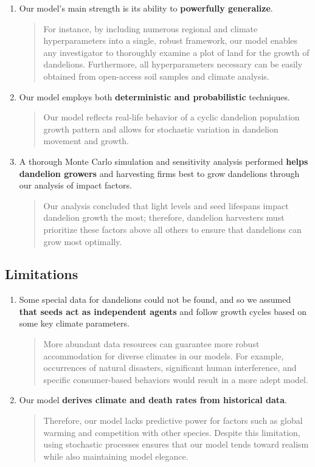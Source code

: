 \begin{enumerate}
 \item Our model’s main strength is its ability to \textbf{powerfully generalize}.
    \begin{quote}
        For instance, by including numerous regional and climate hyperparameters into a single, robust framework, our model enables any investigator to thoroughly examine a plot of land for the growth of dandelions. Furthermore, all hyperparameters necessary can be easily obtained from open-access soil samples and climate analysis.
    \end{quote}
\item  Our model employs both \textbf{deterministic and probabilistic} techniques.
\begin{quote}
    Our model reflects real-life behavior of a cyclic dandelion population growth pattern and allows for stochastic variation in dandelion movement and growth.
\end{quote}

\item A thorough Monte Carlo simulation and sensitivity analysis performed \textbf{helps dandelion growers} and harvesting firms best to grow dandelions through our analysis of impact factors.
\begin{quote}
    Our analysis concluded that light levels and seed lifespans impact dandelion growth the most; therefore, dandelion harvesters must prioritize these factors above all others to ensure that dandelions can grow most optimally.
\end{quote}
\end{enumerate}

\subsection{Limitations}
\begin{enumerate}
\item Some special data for dandelions could not be found, and so we assumed \textbf{that seeds act as independent agents} and follow growth cycles based on some key climate parameters. 
\begin{quote}
    More abundant data resources can guarantee more robust accommodation for diverse climates in our models. For example, occurrences of natural disasters, significant human interference, and specific consumer-based behaviors would result in a more adept model. 
\end{quote}

\item Our model \textbf{derives climate and death rates from historical data}.
\begin{quote}
    Therefore, our model lacks predictive power for factors such as global warming and competition with other species. Despite this limitation, using stochastic processes ensures that our model tends toward realism while also maintaining model elegance.
\end{quote}
\end{enumerate}

